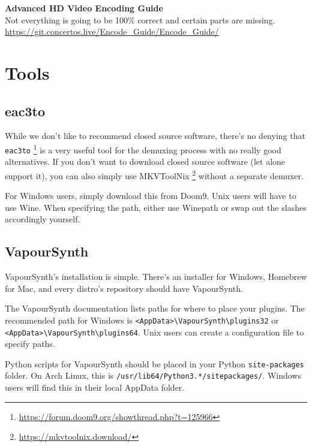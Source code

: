 \documentclass{scrartcl}
\begin{document}
\begin{center}{\textbf{\LARGE Advanced HD Video Encoding Guide} \\[3mm]
Not everything is going to be 100\% correct and certain parts are missing.
\url{https://git.concertos.live/Encode_Guide/Encode_Guide/}}
\end{center}

\vspace{50pt}
\tableofcontents
\pagebreak

\section{Tools}

\subsection{eac3to}

While we don't like to recommend closed source software, there's no denying that \texttt{eac3to} \footnote{\url{https://forum.doom9.org/showthread.php?t=125966}} is a very useful tool for the demuxing process with no really good alternatives.  If you don't want to download closed source software (let alone support it), you can also simply use MKVToolNix \footnote{\url{https://mkvtoolnix.download/}} without a separate demuxer.

For Windows users, simply download this from Doom9.  Unix users will have to use Wine.  When specifying the path, either use Winepath or swap out the slashes accordingly yourself.

\subsection{VapourSynth}

VapourSynth's installation is simple.  There's an installer for Windows, Homebrew for Mac, and every distro's repository should have VapourSynth.

The VapourSynth documentation lists paths for where to place your plugins.  The recommended path for Windows is \texttt{<AppData>\textbackslash VapourSynth\textbackslash plugins32} or\\ \texttt{<AppData>\textbackslash VapourSynth\textbackslash plugins64}.  Unix users can create a configuration file to specify paths.

Python scripts for VapourSynth should be placed in your Python \texttt{site-packages} folder.  On Arch Linux, this is \texttt{/usr/lib64/Python3.*/sitepackages/}.  Windows users will find this in their local AppData folder.
\end{document}
